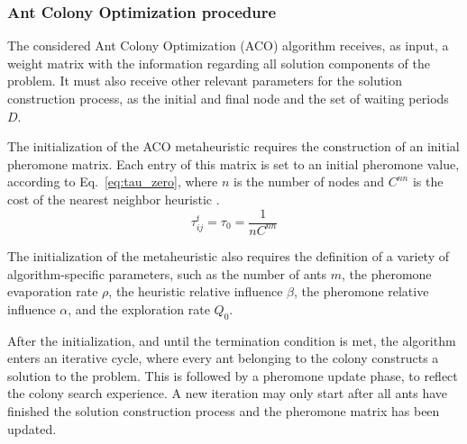 \subsubsection{Ant Colony Optimization procedure}
\label{sec:aco}

The considered Ant Colony Optimization (ACO) algorithm receives, as input, a weight matrix with the information regarding all solution components of the problem. It must also receive other relevant parameters for the solution construction process, as the initial and final node and the set of waiting periods $D$. 

The initialization of the ACO metaheuristic requires the construction of an initial pheromone matrix. Each entry of this matrix is set to an initial pheromone value, according to Eq.~\ref{eq:tau_zero}, where $n$ is the number of nodes and $C^{nn}$ is the cost of the nearest neighbor heuristic \cite{aco_tsp}. 
\begin{equation}
\label{eq:tau_zero}
  \tau_{ij}^{t} = \tau_{0} = \frac{1}{nC^{nn}}
\end{equation}

The initialization of the metaheuristic also requires the definition of a variety of algorithm-specific parameters, such as the number of ants $m$, the pheromone evaporation rate $\rho$, the heuristic relative influence $\beta$, the pheromone relative influence $\alpha$, and the exploration rate $Q_0$. 

After the initialization, and until the termination condition is met, the algorithm enters an iterative cycle, where every ant belonging to the colony constructs a solution to the problem. This is followed by a pheromone update phase, to reflect the colony search experience. A new iteration may only start after all ants have finished the solution construction process and the pheromone matrix has been updated.


